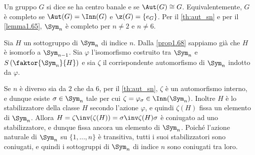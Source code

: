 \documentclass[11pt]{scrartcl}
\begin{document}
	\begin{remark}
		Un gruppo $G$ si dice  se ha centro banale e se
		$\Aut(G) \cong G$. Equivalentemente, $G$ è completo se $\Aut(G) = \Inn(G)$
		e $\z(G) = \{e_G\}$. Per il \autoref{th:aut_sn} e per il \autoref{lemma1.65}, $\Sym_n$ è completo per $n \neq 2$ e $n \neq 6$. \medskip
	\end{remark}
	
	\begin{remark}
		Sia $H$ un sottogruppo di $\Sym_n$ di indice $n$. Dalla \autoref{prop1.68}
		sappiamo già che $H$ è isomorfo a $\Sym_{n-1}$.
		Sia $\varphi$ l'isomorfismo costruito tra $\Sym_n$ e $S\left( \faktor{\Sym_n}{H} \right)$ e sia $\zeta$ il corrispondente automorfismo di $\Sym_n$ indotto da $\varphi$. \medskip
		
		Se $n$ è diverso sia da $2$ che da $6$, per il \autoref{th:aut_sn},
		$\zeta$ è un automorfismo interno, e dunque esiste $\sigma \in \Sym_n$ tale
		per cui $\zeta = \varphi_\sigma \in \Inn(\Sym_n)$. Inoltre $H$ è lo stabilizzatore
		della classe $H$ secondo l'azione $\varphi$, e quindi $\zeta(H)$ fissa un elemento
		di $\Sym_n$. Allora $H = \zeta\inv(\zeta(H)) = \sigma\inv \zeta(H) \sigma$
		è coniugato ad uno stabilizzatore, e dunque fissa ancora un elemento di
		$\Sym_n$. Poiché l'azione naturale di $\Sym_n$ su $\{1, \ldots, n\}$ è transitiva, tutti i suoi
		stabilizzatori sono coniugati, e quindi i sottogruppi di $\Sym_n$ di indice
		$n$ sono coniugati tra loro.
	\end{remark}
	
\end{document}
